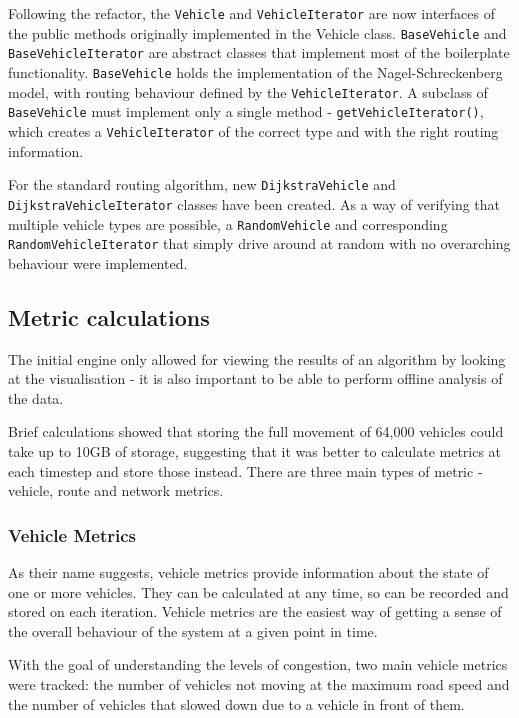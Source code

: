 \documentclass[ %
                    author={Alexander Hill},
                supervisor={Dr. Benjamin Sach},
                    degree={MEng},
                     title={MARMOSET},
                  subtitle={Multi-Agent Route Management using Online Simulation for Efficient Transportation},
                      type={research},
                      year={2016} ]{dissertation}
\begin{document}
Following the refactor, the \texttt{Vehicle} and \texttt{VehicleIterator} are
now interfaces of the public methods originally implemented in the Vehicle
class.  \texttt{BaseVehicle} and \texttt{BaseVehicleIterator} are abstract
classes that implement most of the boilerplate functionality.
\texttt{BaseVehicle} holds the implementation of the Nagel-Schreckenberg model,
with routing behaviour defined by the \texttt{VehicleIterator}. A subclass of
\texttt{BaseVehicle} must implement only a single method -
\texttt{getVehicleIterator()}, which creates a \texttt{Vehicle\-Iterator} of the
correct type and with the right routing information.

For the standard routing algorithm, new \texttt{DijkstraVehicle} and
\texttt{DijkstraVehicleIterator} classes have been created. As a way of
verifying that multiple vehicle types are possible, a \texttt{RandomVehicle} and
corresponding \texttt{RandomVehicleIterator} that simply drive around at random
with no overarching behaviour were implemented.

\subsection{Metric calculations}

The initial engine only allowed for viewing the results of an algorithm by
looking at the visualisation - it is also important to be able to perform
offline analysis of the data.

Brief calculations showed that storing the full movement of 64,000 vehicles
could take up to 10GB of storage, suggesting that it was better to calculate
metrics at each timestep and store those instead. There are three main types of
metric - vehicle, route and network metrics.

\subsubsection{Vehicle Metrics}

As their name suggests, vehicle metrics provide information about the state of
one or more vehicles. They can be calculated at any time, so can be recorded and
stored on each iteration. Vehicle metrics are the easiest way of getting a sense
of the overall behaviour of the system at a given point in time.

With the goal of understanding the levels of congestion, two main vehicle
metrics were tracked: the number of vehicles not moving at the maximum road
speed and the number of vehicles that slowed down due to a vehicle in front of
them.
\end{document}
